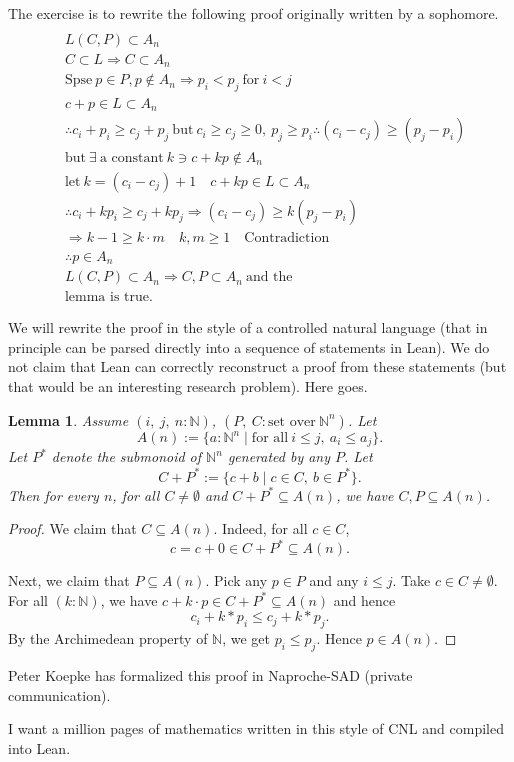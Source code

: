 \documentclass[12pt]{amsart}
\newtheorem{lemma}[definition]{Lemma}
\newcommand{\Nat}{\ensuremath{{\mathbb N}}}
\newcommand{\h}[1]{\text{#1}}
\renewcommand{\~}{\ }
\renewcommand{\_}{\textunderscore}
\begin{document}
The exercise is to rewrite the following
proof originally written by a sophomore.
\begin{align*}
  \\ &L(C,P)\subset A_n
  \\ &C\subset L\Rightarrow C\subset A_n
  \\ &\h{Spse}\ p\in P, p\notin A_n\Rightarrow p_i < p_j\ \h{for}\ i < j
  \\ &c+p\in L \subset A_n
  \\ &\therefore c_i+p_i\ge c_j+p_j\ \h{but}\ c_i\ge c_j\ge 0,\ p_j\ge p_i\therefore (c_i-c_j)\ge (p_j-p_i)
  \\ &\h{but}\ \exists\ \h{a constant}\ k \ni c + k p\notin A_n
  \\ &\h{let}\ k=(c_i-c_j)+1\quad c+k p\in L\subset A_n
  \\ &\therefore c_i + k p_i \ge c_j + k p_j \Rightarrow (c_i-c_j)\ge k(p_j-p_i)
  \\ &\Rightarrow k-1 \ge k\cdot m\quad k,m\ge 1\quad \h{Contradiction}
  \\ &\therefore p\in A_n
  \\ &L(C,P)\subset A_n \Rightarrow C, P\subset A_n\ \h{and the}
  \\ &\h{lemma is true}.
\end{align*}

We will rewrite the proof in the style of a controlled natural
language (that in principle can be parsed directly into a sequence of
statements in Lean).  We do not claim that Lean can correctly
reconstruct a proof from these statements (but that would
be an interesting research problem). Here goes.

\begin{lemma}
  Assume $(i,\ j,\ n:\Nat)$, $(P,\ C:\h{set over}\ \Nat^n)$.
  Let 
  \[
  A(n):= \{ a : \Nat^n \mid \h{for all}\ i \le j,\ a_i \le a_j\}.
  \]
  Let $P^*$
  denote the submonoid of $\Nat^n$ generated by any $P$.
  Let
  \[
  C+P^* :=
  \{ c + b \mid c \in C,\ b\in P^*\}.
  \]
  Then for every $n$,
  for all $C\ne \emptyset$ and 
  $C+P^*\subseteq A(n)$, we have $C,P\subseteq A(n)$.
\end{lemma}

\begin{proof}
  We claim that $C\subseteq A(n)$.
  Indeed, for all $c\in C$,
  \[
  c = c + 0 \in C+P^* \subseteq A(n).
  \]
  
  Next, we claim that $P\subseteq A(n)$.  Pick any $p\in P$ and any
  $i\le j$.  Take $c \in C\ne\emptyset$.  For all $(k:\Nat)$, we have
  $c + k\cdot p\in C+P^*\subseteq A(n)$ and hence
  \[
  c_i + k* p_i \le c_j + k*p_j.
  \]
  By the Archimedean property of $\Nat$, we get $p_i\le
  p_j$.  Hence $p\in A(n)$.
\end{proof}

Peter Koepke has formalized this proof in Naproche-SAD (private communication).

I want a million pages of mathematics written in this style of CNL and
compiled into Lean.
\end{document}
